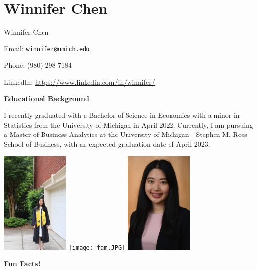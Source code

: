 \documentclass[
]{book}
\begin{document}
\hypertarget{winnifer-chen}{%
\section{Winnifer Chen}\label{winnifer-chen}}

Winnifer Chen

Email: \href{mailto:winnifer@umich.edu}{\nolinkurl{winnifer@umich.edu}}

Phone: (980) 298-7184

LinkedIn: \url{https://www.linkedin.com/in/winnifer/}

\textbf{Educational Background}

I recently graduated with a Bachelor of Science in Economics with a minor in Statistics from the University of Michigan in April 2022. Currently, I am pursuing a Master of Business Analytics at the University of Michigan - Stephen M. Ross School of Business, with an expected graduation date of April 2023.

\includegraphics[width=0.25\textwidth,height=\textheight]{grad.JPG}
\texttt{[image: fam.JPG]}
\includegraphics[width=0.25\textwidth,height=\textheight]{headshot.jpg}

\textbf{Fun Facts!}
\end{document}

